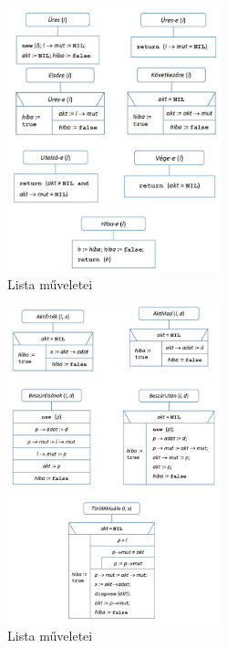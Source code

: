 \documentclass[12pt,margin=0px]{article}
\begin{document}
\begin{itemize}
		\begin{figure}[H]
			\centering
			\includegraphics[width=0.55\textwidth]{img/list_operations1.png}
			\caption{Lista műveletei}
		\end{figure}

		\begin{figure}[H]
			\centering
			\includegraphics[width=0.55\textwidth]{img/list_operations2.png}
			\caption{Lista műveletei}
		\end{figure}


\end{itemize}
\end{document}
